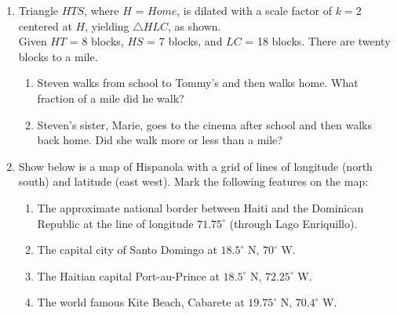 \begin{enumerate}
\item Triangle $HTS$, where $H$ = $Home$, is dilated with a scale factor of $k=2$ centered at $H$, yielding $\triangle HLC$, as shown.\\[0.25cm]
Given $HT$ = 8 blocks, $HS$ = 7 blocks, and $LC$ = 18 blocks. There are twenty blocks to a mile.
\begin{enumerate}
  \item Steven walks from school to Tommy's and then walks home. What fraction of a mile did he walk?
\begin{flushright}
\end{flushright} 
  \item Steven's sister, Marie, goes to the cinema after school and then walks back home. Did she walk more or less than a mile?
\end{enumerate}

\newpage
\item Show below is a map of Hispanola with a grid of lines of longitude (north south) and latitude (east west). Mark the following features on the map:
\begin{enumerate}
  \item The approximate national border between Haiti and the Dominican Republic at the line of longitude $71.75^\circ$ (through Lago Enriquillo).
  \item The capital city of Santo Domingo at $18.5^\circ$ N, $70^\circ$ W.
  \item The Haitian capital Port-au-Prince at $18.5^\circ$ N, $72.25^\circ$ W.
  \item The world famous Kite Beach, Cabarete at $19.75^\circ$ N, $70.4^\circ$ W.


\end{enumerate}
\end{enumerate}
